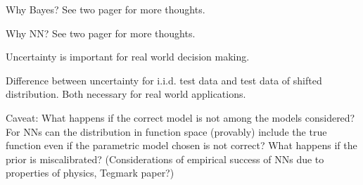 \documentclass[../thesis.tex]{subfiles}
\begin{document}
Why Bayes? See two pager for more thoughts.

Why NN? See two pager for more thoughts.

Uncertainty is important for real world decision making.

Difference between uncertainty for i.i.d. test data and test data of shifted distribution. Both necessary for real world applications.

Caveat: What happens if the correct model is not among the models considered? For NNs can the distribution in function space (provably) include the true function even if the parametric model chosen is not correct? What happens if the prior is miscalibrated? (Considerations of empirical success of NNs due to properties of physics, Tegmark paper?)
\end{document}
